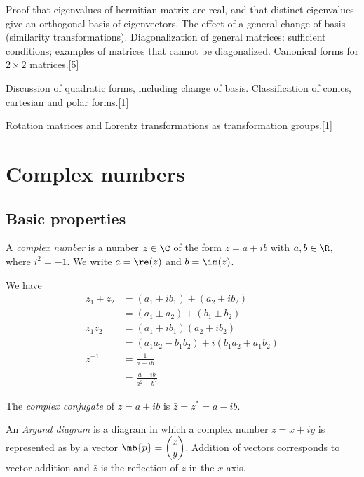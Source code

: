 \documentclass[a4paper]{article}
\begin{document}
{\vspace{5pt}
\noindent Proof that eigenvalues of hermitian matrix are real, and that distinct eigenvalues give an orthogonal basis of eigenvectors. The effect of a general change of basis (similarity transformations). Diagonalization of general matrices: sufficient conditions; examples of matrices that cannot be diagonalized. Canonical forms for $2 \times 2$ matrices.\hspace*{\fill}[5]

\vspace{5pt}
\noindent Discussion of quadratic forms, including change of basis. Classification of conics, cartesian and polar forms.\hspace*{\fill}[1]

\vspace{5pt}
\noindent Rotation matrices and Lorentz transformations as transformation groups.\hspace*{\fill}[1]}

\tableofcontents
\newpage
\section{Complex numbers}
\subsection{Basic properties}
\begin{defi}
  A \emph{complex number} is a number $z\in \C$ of the form $z = a + ib$ with $a, b\in \R$, where $i^2=-1$. We write $a = \re(z)$ and $b = \im(z)$.
\end{defi}

We have
\begin{align*}
  z_1\pm z_2 &= (a_1 + ib_1)\pm (a_2 + ib_2)\\
  &= (a_1\pm a_2) + (b_1 \pm b_2)\\
  z_1z_2 &= (a_1 + ib_1)(a_2 + ib_2)\\
  &= (a_1a_2 - b_1b_2) + i(b_1a_2 + a_1b_2)\\
  z^{-1} &= \frac{1}{a + ib}\\
  &= \frac{a - ib}{a^2 + b^2}
\end{align*}
\begin{defi}
  The \emph{complex conjugate} of $z = a+ ib$ is $\bar{z} = z^* = a - ib$.
\end{defi}

\begin{defi}
  An \emph{Argand diagram} is a diagram in which a complex number $z = x + iy$ is represented as by a vector $\mb{p}=\begin{pmatrix}x\\y\end{pmatrix}$. Addition of vectors corresponds to vector addition and $\bar{z}$ is the reflection of $z$ in the $x$-axis.
\end{defi}
\end{document}
